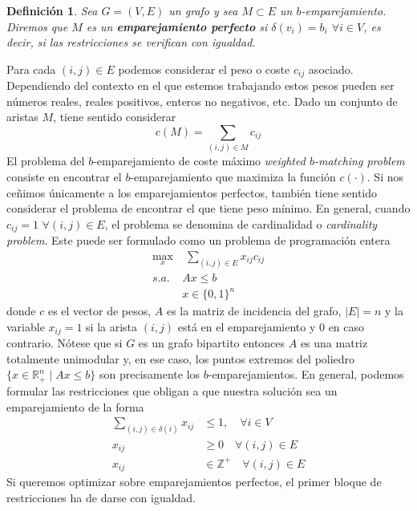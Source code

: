 \documentclass[twoside,a4paper,openright,12pt]{book}
\newtheorem{defi}{Definici\'on}[section]
\newcommand{\R}{\mathbb{R}}
\newcommand{\Z}{\mathbb{Z}}
\begin{document}
\begin{defi}
Sea $G=(V,E)$ un grafo y sea $M\subset E$ un $b$-emparejamiento. Diremos que $M$ es un \textbf{emparejamiento perfecto} si $\delta(v_i)=b_i$ $\forall i \in V$, es decir, si las restricciones se verifican con igualdad.
\end{defi}
Para cada $(i,j)\in E$ podemos considerar el peso o coste $c_{ij}$ asociado. Dependiendo del contexto en el que estemos trabajando estos pesos pueden ser números reales, reales positivos, enteros no negativos, etc. Dado un conjunto de aristas $M$, tiene sentido considerar
$$
c(M)=\sum_{(i,j)\in M} c_{ij}
$$
El problema del $b$-emparejamiento de coste máximo \textit{weighted $b$-matching problem} consiste en encontrar el $b$-emparejamiento que maximiza la función $c(\cdot)$. Si nos ceñimos únicamente a los emparejamientos perfectos, también tiene sentido considerar el problema de encontrar el que tiene peso mínimo. En general, cuando $c_{ij}=1$ $\forall (i,j)\in E$, el problema se denomina de cardinalidad o \textit{cardinality problem}. Este puede ser formulado como un problema de programación entera
\begin{align*}
\max_{x} &\; \sum_{(i,j)\in E} x_{ij}c_{ij}  \nonumber\\ 
s.a.\;  &  Ax\leq b \\
& x\in\{0,1\}^n\nonumber
\end{align*}
donde $c$ es el vector de pesos, $A$ es la matriz de incidencia del grafo, $|E|=n$ y la variable $x_{ij}=1$ si la arista $(i,j)$ está en el emparejamiento y $0$ en caso contrario. Nótese que si $G$ es un grafo bipartito entonces $A$ es una matriz totalmente unimodular y, en ese caso, los puntos extremos del poliedro $\{x \in \R^n_+\mid Ax\leq b\}$ son precisamente los $b$-emparejamientos.
En general, podemos formular las restricciones que obligan a que nuestra solución sea un emparejamiento de la forma
\begin{align*}
\sum_{(i,j)\in\delta(i)} x_{ij} &\leq 1, \quad \forall i \in V\\
 x_{ij}&\geq 0 \quad \forall (i,j) \in E\\
x_{ij} &\in \Z^+  \quad \forall (i,j) \in E 
\end{align*}
Si queremos optimizar sobre emparejamientos perfectos, el primer bloque de restricciones ha de darse con igualdad.
\end{document}
